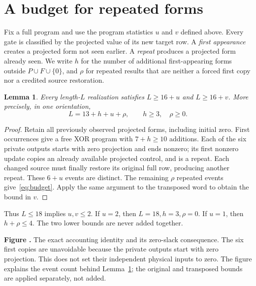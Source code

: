 \documentclass[11pt]{article}
\newtheorem{lemma}[theorem]{Lemma}
\newcommand{\prooffigure}[3]{%
  \begin{center}
  \begin{minipage}{.98\linewidth}
  \centering
  \resizebox{\linewidth}{!}{}\par
  \refstepcounter{figure}\label{#2}%
  \small\textbf{Figure \thefigure.} #3
  \end{minipage}
  \end{center}}
\begin{document}
\section{A budget for repeated forms}
Fix a full program and use the program statistics $u$ and $v$ defined above.
Every gate is classified by the projected value of its new target row. A
\emph{first appearance} creates a projected form not seen earlier. A
\emph{repeat} produces a projected form already seen. We write $h$ for the
number of additional first-appearing forms outside $P\cup F\cup\{0\}$, and
$\rho$ for repeated results that are neither a forced first copy nor a
credited source restoration.
\begin{lemma}\label{lem:budget}
Every length-$L$ realization satisfies $L\ge16+u$ and $L\ge16+v$.
More precisely, in one orientation,
\begin{equation}\label{eq:budget}
L=13+h+u+\rho,\qquad h\ge3,\quad \rho\ge0.
\end{equation}
\end{lemma}
\begin{proof}
Retain all previously observed projected forms, including initial zero.
First occurrences give a free XOR program with $7+h\ge10$ additions.
Each of the six private outputs starts with zero projection and ends
nonzero; its first nonzero update copies an already available projected
control, and is a repeat. Each changed source must finally restore its
original full row, producing another repeat. These $6+u$ events are
distinct. The remaining $\rho$ repeated events give~\eqref{eq:budget}.
Apply the same argument to the transposed word to obtain the bound in $v$.
\end{proof}
Thus $L\le18$ implies $u,v\le2$. If $u=2$, then
$L=18,h=3,\rho=0$. If $u=1$, then $h+\rho\le4$. The two lower bounds are
never added together.
\prooffigure{operation_budget}{fig:budget}{The exact accounting identity
and its zero-slack consequence. The six first copies are unavoidable
because the private outputs start with zero projection. This does not set
their independent physical inputs to zero. The figure explains the event
count behind Lemma~\ref{lem:budget}; the original and transposed bounds are
applied separately, not added.}
\end{document}
